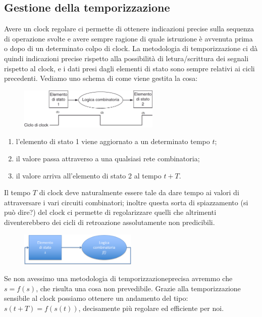 \documentclass[class=book, crop=false, oneside]{standalone}
\begin{document}
\subsection{Gestione della temporizzazione}
Avere un clock regolare ci permette di ottenere indicazioni precise sulla sequenza di operazione svolte e avere sempre ragione di quale istruzione è avvenuta prima o dopo di un determinato colpo di clock. La metodologia di temporizzazione ci dà quindi indicazioni precise rispetto alla possibilità di letura/scrittura dei segnali rispetto al clock, e i dati presi dagli elementi di stato sono sempre relativi ai cicli precedenti. Vediamo uno schema di come viene gestita la cosa:
\begin{figure}[H]
	\centering
	\includegraphics[width=0.6\textwidth,keepaspectratio]{clock}
\end{figure}
\begin{enumerate}
	\item l'elemento di stato 1 viene aggiornato a un determinato tempo \(t\);
	\item il valore passa attraverso a una qualsiasi rete combinatoria;
	\item il valore arriva all'elemento di stato 2 al tempo \(t + T\).
\end{enumerate}
Il tempo \(T\) di clock deve naturalmente essere tale da dare tempo ai valori di attraversare i vari circuiti combinatori; inoltre questa sorta di spiazzamento (si può dire?) del clock ci permette di regolarizzare quelli che altrimenti diventerebbero dei cicli di retroazione assolutamente non predicibili.
\begin{figure}[H]
	\centering
	\includegraphics[width=0.5\textwidth,keepaspectratio]{retroaz}
\end{figure}
Se non avessimo una metodologia di temporizzazioneprecisa avremmo che \(s = f(s)\), che risulta una cosa non prevedibile. Grazie alla temporizzazione sensibile al clock possiamo ottenere un andamento del tipo: \(s(t + T) = f(s(t))\), decisamente più regolare ed efficiente per noi.
\end{document}
